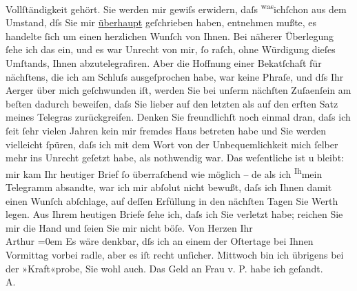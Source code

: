 \begin{ledgroupsized}[t]{13cm}
               Vollſtändigkeit gehört. {\pb}Sie werden mir gewiſs erwidern,
               daſs \substVorne{}\textsuperscript{was}\substDazwischen{}ich\substHinten{}{ }ſchon aus dem Umstand, dſs Sie mir \uline{überhaupt} geſchrieben haben, entnehmen mußte, es
               handelte ſich um einen herzlichen Wunſch von Ihnen. Bei näherer Überlegung ſehe ich
               das ein, und es war Unrecht {\pb}von mir, ſo raſch, ohne
               Würdigung dieſes Umſtands, Ihnen abzutelegrafiren. Aber die Hoffnung einer Beka{\geminationn}tſchaft für nächſtens, die ich am Schluſs ausgeſprochen
               habe, war keine Phraſe, und dſs Ihr Aerger über mich geſchwunden iſt, werden Sie bei
               unſerm nächſten {\pb}Zuſa{\geminationm}enſein
                  \introOben{}am beſten\introOben{} dadurch beweiſen, daſs Sie lieber auf den
               letzten als auf den erſten Satz meines Telegra{\geminationm}s
               zurückgreifen. Denken Sie freundlichſt noch einmal dran, daſs ich ſeit ſehr vielen
               Jahren kein mir fremdes Haus betreten habe und Sie {\pb}werden vielleicht ſpüren, daſs ich mit dem Wort von der Unbequemlichkeit mich
               ſelber mehr ins Unrecht geſetzt habe, als nothwendig war. Das weſentliche ist u
               bleibt: mir kam Ihr \introOben{}heutiger\introOben{} Brief ſo überraſchend wie
               möglich – \introOben{}de{\geminationn}\introOben{} als ich \substVorne{}\textsuperscript{Ih}\substDazwischen{}mein\substHinten{} Telegramm absandte, {\pb}war ich mir abſolut nicht
               bewußt, daſs ich Ihnen damit einen Wunſch abſchlage, auf deſſen Erfüllung in den
               nächſten Tagen Sie Werth legen. Aus Ihrem heutigen Briefe ſehe ich, daſs ich Sie
               verletzt habe; reichen Sie mir die Hand und ſeien Sie mir nicht böſe.\pend
           \pstart
           Von Herzen Ihr{\\[\baselineskip]}\spacefill\mbox{Arthur}\pend
           \leftskip=0em{}\pstart
           \noindent{}{\pb}Es wäre denkbar, dſs ich an einem der
                     Oſtertage bei Ihnen Vormittag vorbei radle, aber es iſt recht
                  unſicher.\pend
           \pstart
           Mittwoch bin ich übrigens bei der »Kraft«probe, Sie wohl auch.\pend
           \pstart
           Das Geld an Frau v. P. habe ich geſandt.{\\}\spacefill\mbox{A.}\pend
           
         
         \endnumbering{}\end{ledgroupsized}  \newcommand{\dateiname}{L01211}\newcommand{\titel}{Arthur Schnitzler an Hugo von Hofmannsthal, 29. 3. 1902}\newcommand{\editorInnen}{Martin Anton Müller und Gerd-Hermann Susen}
      
